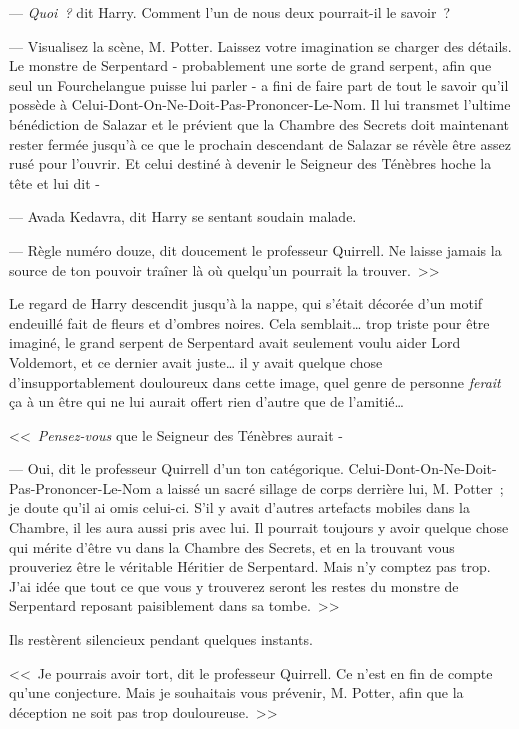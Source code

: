 --- \emph{Quoi~?} dit Harry. Comment l'un de nous deux pourrait-il le savoir~?

--- Visualisez la scène, M. Potter. Laissez votre imagination se charger des détails. Le monstre de Serpentard - probablement une sorte de grand serpent, afin que seul un Fourchelangue puisse lui parler - a fini de faire part de tout le savoir qu'il possède à Celui-Dont-On-Ne-Doit-Pas-Prononcer-Le-Nom. Il lui transmet l'ultime bénédiction de Salazar et le prévient que la Chambre des Secrets doit maintenant rester fermée jusqu'à ce que le prochain descendant de Salazar se révèle être assez rusé pour l'ouvrir. Et celui destiné à devenir le Seigneur des Ténèbres hoche la tête et lui dit -

--- Avada Kedavra, dit Harry se sentant soudain malade.

--- Règle numéro douze, dit doucement le professeur Quirrell. Ne laisse jamais la source de ton pouvoir traîner là où quelqu'un pourrait la trouver.~>>

Le regard de Harry descendit jusqu'à la nappe, qui s'était décorée d'un motif endeuillé fait de fleurs et d'ombres noires. Cela semblait… trop triste pour être imaginé, le grand serpent de Serpentard avait seulement voulu aider Lord Voldemort, et ce dernier avait juste… il y avait quelque chose d'insupportablement douloureux dans cette image, quel genre de personne \emph{ferait} ça à un être qui ne lui aurait offert rien d'autre que de l'amitié…

<<~\emph{Pensez-vous} que le Seigneur des Ténèbres aurait -

--- Oui, dit le professeur Quirrell d'un ton catégorique. Celui-Dont-On-Ne-Doit-Pas-Prononcer-Le-Nom a laissé un sacré sillage de corps derrière lui, M. Potter~; je doute qu'il ai omis celui-ci. S'il y avait d'autres artefacts mobiles dans la Chambre, il les aura aussi pris avec lui. Il pourrait toujours y avoir quelque chose qui mérite d'être vu dans la Chambre des Secrets, et en la trouvant vous prouveriez être le véritable Héritier de Serpentard. Mais n'y comptez pas trop. J'ai idée que tout ce que vous y trouverez seront les restes du monstre de Serpentard reposant paisiblement dans sa tombe.~>>

Ils restèrent silencieux pendant quelques instants.

<<~Je pourrais avoir tort, dit le professeur Quirrell. Ce n'est en fin de compte qu'une conjecture. Mais je souhaitais vous prévenir, M. Potter, afin que la déception ne soit pas trop douloureuse.~>>

